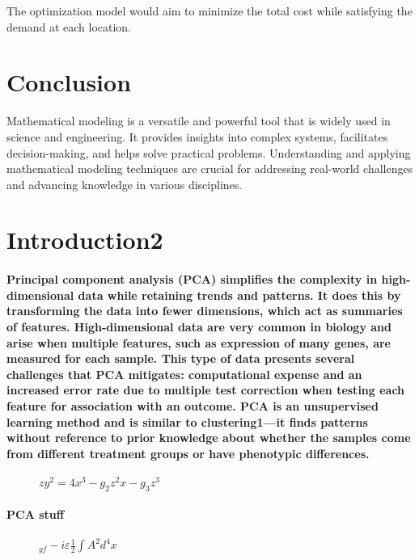 \documentclass{article}
\begin{document}
The optimization model would aim to minimize the total cost while satisfying the demand at each location.

\section{Conclusion}

Mathematical modeling is a versatile and powerful tool that is widely used in science and engineering. It provides insights into complex systems, facilitates decision-making, and helps solve practical problems. Understanding and applying mathematical modeling techniques are crucial for addressing real-world challenges and advancing knowledge in various disciplines.
\section{Introduction2}
\paragraph{Principal component analysis (PCA) simplifies the complexity in high-dimensional data while retaining trends and patterns. It does this by transforming the data into fewer dimensions, which act as summaries of features. High-dimensional data are very common in biology and arise when multiple features, such as expression of many genes, are measured for each sample. This type of data presents several challenges that PCA mitigates: computational expense and an increased error rate due to multiple test correction when testing each feature for association with an outcome. PCA is an unsupervised learning method and is similar to clustering1—it finds patterns without reference to prior knowledge about whether the samples come from different treatment groups or have phenotypic differences.}

\begin{figure}[h]
\centering
    $z y ^ { 2 } = 4 x ^ { 3 } - g _ { 2 } z ^ { 2 } x - g _ { 3 } z ^ { 3 }$
\end{figure}
\paragraph{PCA stuff}
\begin{figure}[h]
\centering
    $_ { g f } - i \varepsilon \frac { 1 } { 2 } \int A ^ { 2 } d ^ { 4 } x$
\end{figure}
\end{document}
